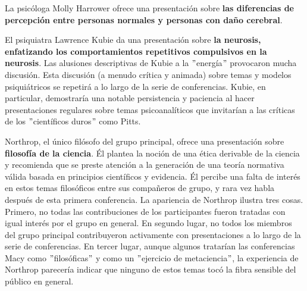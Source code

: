 \documentclass[11pt]{article}
\begin{document}
		La psicóloga Molly Harrower ofrece una presentación sobre \textbf{las diferencias de percepción entre personas normales y personas con daño cerebral}.\par
		El psiquiatra Lawrence Kubie da una presentación sobre \textbf{la neurosis, enfatizando los comportamientos repetitivos compulsivos en la neurosis}. Las alusiones descriptivas de Kubie a la $"$energía$"$ provocaron mucha discusión. Esta discusión (a menudo crítica y animada) sobre temas y modelos psiquiátricos se repetirá a lo largo de la serie de conferencias. Kubie, en particular, demostraría una notable persistencia y paciencia al hacer presentaciones regulares sobre temas psicoanalíticos que invitarían a las críticas de los $"$científicos duros$"$ como Pitts.\par
		Northrop, el único filósofo del grupo principal, ofrece una presentación sobre \textbf{filosofía de la ciencia}. Él plantea la noción de una ética derivable de la ciencia y recomienda que se preste atención a la generación de una teoría normativa válida basada en principios científicos y evidencia. Él percibe una falta de interés en estos temas filosóficos entre sus compañeros de grupo, y rara vez habla después de esta primera conferencia. La apariencia de Northrop ilustra tres cosas. Primero, no todas las contribuciones de los participantes fueron tratadas con igual interés por el grupo en general. En segundo lugar, no todos los miembros del grupo principal contribuyeron activamente con presentaciones a lo largo de la serie de conferencias. En tercer lugar, aunque algunos tratarían las conferencias Macy como $"$filosóficas$"$ y como un $"$ejercicio de metaciencia$"$, la experiencia de Northrop parecería indicar que ninguno de estos temas tocó la fibra sensible del público en general.\par
\end{document}
